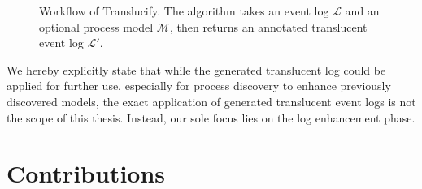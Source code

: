 \begin{figure}[h!]
    \centering
    \caption{Workflow of Translucify. The algorithm takes an event log $\mathcal{L}$ and an optional process model $\mathcal{M}$, then returns an annotated translucent event log $\mathcal{L'}$.}
    \label{fig:translucify_workflow}
\end{figure}

We hereby explicitly state that while the generated translucent log could be applied for further use, especially for process discovery to enhance previously discovered models, the exact application of generated translucent event logs is not the scope of this thesis. Instead, our sole focus lies on the log enhancement phase.

\section{Contributions}
\begin{comment}
    In this section, you list the contributions that your thesis makes to our wonderful world (of science).
Again, there is a strong link to the previous section.
Usually, you have achieved your research goals.
Hence, the contributions are concrete statements of the goals you have achieved.
Additionally, your evaluation (most likely also stressed as a goal) is a contribution.
Any implementation or prototype can also be quantified as a contribution.

Some examples:
\begin{itemize}
	\item A systematic literature review covering 35 articles on noise patterns in real event data
	\item A noise detection algorithm based on dynamic programming and symbolic linking
	\item ...
\end{itemize}
\end{comment}



